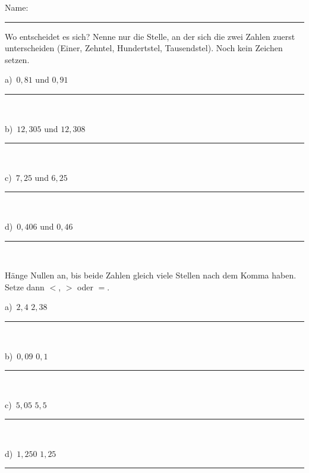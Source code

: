 \documentclass[11pt]{article}
\providecommand{\linie}[1]{\,{\color{black!45}\rule[-1pt]{#1}{0.4pt}}\,}
\newcommand{\aufg}[3]{\par\noindent\makebox[0pt][r]{#3}\begin{minipage}[t]{\linewidth}#1\end{minipage}\par}
\newcommand{\nr}[1]{\makebox[7mm][l]{\textbf{#1}}}
\begin{document}
\hfill{\small Name: \rule{40mm}{0.4pt}}\par\smallskip
{}\par\medskip
\par\Needspace{25mm}\noindent\colorbox{black!12}{}\hspace{2mm}{\bfseries Dezimalzahlen vergleichen}\par\smallskip
\aufg{\nr{A1}\begin{minipage}[t]{\dimexpr\linewidth-7mm\relax}Wo entscheidet es sich? Nenne nur die Stelle, an der sich die zwei Zahlen zuerst unterscheiden (Einer, Zehntel, Hundertstel, Tausendstel). Noch kein Zeichen setzen.\par\smallskip
\noindent\begin{minipage}[t]{0.48\linewidth}\raggedright
a)\ $0{,}81$ und $0{,}91$\linie{25mm}
\end{minipage}\hfill
\begin{minipage}[t]{0.48\linewidth}\raggedright
b)\ $12{,}305$ und $12{,}308$\linie{25mm}
\end{minipage}\par\smallskip
\noindent\begin{minipage}[t]{0.48\linewidth}\raggedright
c)\ $7{,}25$ und $6{,}25$\linie{25mm}
\end{minipage}\hfill
\begin{minipage}[t]{0.48\linewidth}\raggedright
d)\ $0{,}406$ und $0{,}46$\linie{25mm}
\end{minipage}\par\smallskip\end{minipage}}{}{}
\medskip
\aufg{\nr{A2}\begin{minipage}[t]{\dimexpr\linewidth-7mm\relax}Hänge Nullen an, bis beide Zahlen gleich viele Stellen nach dem Komma haben. Setze dann $<$, $>$ oder $=$.\par\smallskip
\noindent\begin{minipage}[t]{0.48\linewidth}\raggedright
a)\ $2{,}4$ \fbox{\phantom{$<$}} $2{,}38$\linie{25mm}
\end{minipage}\hfill
\begin{minipage}[t]{0.48\linewidth}\raggedright
b)\ $0{,}09$ \fbox{\phantom{$<$}} $0{,}1$\linie{25mm}
\end{minipage}\par\smallskip
\noindent\begin{minipage}[t]{0.48\linewidth}\raggedright
c)\ $5{,}05$ \fbox{\phantom{$<$}} $5{,}5$\linie{25mm}
\end{minipage}\hfill
\begin{minipage}[t]{0.48\linewidth}\raggedright
d)\ $1{,}250$ \fbox{\phantom{$<$}} $1{,}25$\linie{25mm}
\end{minipage}\par\smallskip\end{minipage}}{}{}
\end{document}
